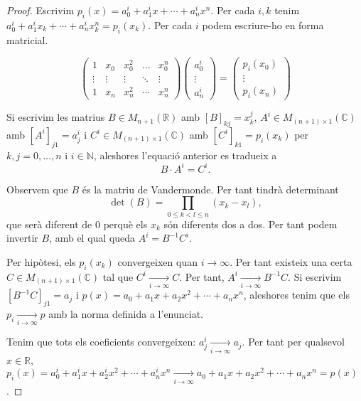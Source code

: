 \documentclass{article}
\theoremstyle{definition}
\begin{document}
\begin{proof}
Escrivim $p_i(x)=a_0^i+a_1^ix+\cdots+a_n^ix^n$. Per cada $i,k$ tenim $a_0^i+a_1^ix_k+\cdots+a_n^ix_k^n=p_i(x_k)$. Per cada $i$ podem escriure-ho en forma matricial.

\[\left(\begin{matrix}1&x_0&x_0^2&\ldots&x_0^n\\\vdots&\vdots&\vdots&\ddots&\vdots\\1&x_n&x_n^2&\cdots&x_n^n\end{matrix}\right)\left(\begin{matrix}a_0^i\\\vdots\\a_n^i\end{matrix}\right)=\left(\begin{matrix}p_i(x_0)\\\vdots\\p_i(x_n)\end{matrix}\right)\]

Si escrivim les matrius $B\in M_{n+1}(\mathbb{R})$ amb $[B]_{kj}=x_k^j$, $A^i\in M_{(n+1)\times1}(\mathbb{C})$ amb $[A^i]_{j1}=a_j^i$ i $C^i\in M_{(n+1)\times1}(\mathbb{C})$ amb $[C^i]_{k1}=p_i(x_k)$ per $k,j=0,\ldots,n$ i $i\in\mathbb{N}$, aleshores l'equaci\'{o} anterior es tradueix a
\[B\cdot A^i=C^i.\]

Observem que $B$ \'{e}s la matriu de Vandermonde. Per tant tindr\`{a} determinant
\[\det(B)=\prod_{0\leq k<l\leq n}(x_k-x_l),\]
que ser\`{a} diferent de $0$ perqu\`{e} els $x_k$ s\'{o}n diferents dos a dos. Per tant podem invertir $B$, amb el qual queda $A^i=B^{-1}C^i$.

Per hip\`{o}tesi, els $p_i(x_k)$ convergeixen quan $i\to\infty$. Per tant existeix una certa $C\in M_{(n+1)\times1}(\mathbb{C})$ tal que $C^i\xrightarrow[i\to\infty]{}C$. Per tant, $A^i\xrightarrow[i\to\infty]{}B^{-1}C$. Si escrivim $[B^{-1}C]_{j1}=a_j$ i $p(x)=a_0+a_1x+a_2x^2+\cdots+a_nx^n$, aleshores tenim que els $p_i\xrightarrow[i\to\infty]{}p$ amb la norma definida a l'enunciat.

Tenim que tots els coeficients convergeixen: $a_j^i\xrightarrow[i\to\infty]{}a_j$. Per tant per qualsevol $x\in\mathbb{R}$, $p_i(x)=a_0^i+a_1^ix+a_2^ix^2+\cdots+a_n^ix^n\xrightarrow[i\to\infty]{}a_0+a_1x+a_2x^2+\cdots+a_nx^n=p(x)$.
\end{proof}
\end{document}
